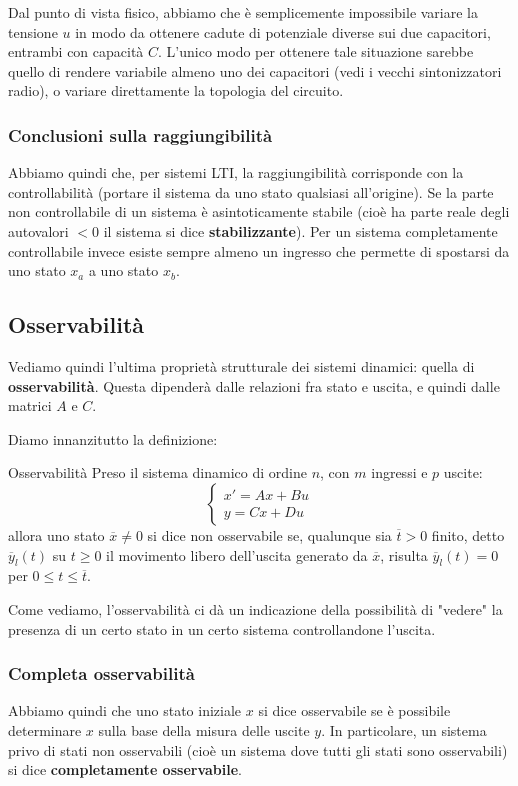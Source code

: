 \documentclass[a4paper,11pt]{article}
\begin{document}
Dal punto di vista fisico, abbiamo che è semplicemente impossibile variare la tensione $u$ in modo da ottenere cadute di potenziale diverse sui due capacitori, entrambi con capacità $C$.
L'unico modo per ottenere tale situazione sarebbe quello di rendere variabile almeno uno dei capacitori (vedi i vecchi sintonizzatori radio), o variare direttamente la topologia del circuito. 

\subsubsection{Conclusioni sulla raggiungibilità}
Abbiamo quindi che, per sistemi LTI, la raggiungibilità corrisponde con la controllabilità (portare il sistema da uno stato qualsiasi all'origine).
Se la parte non controllabile di un sistema è asintoticamente stabile (cioè ha parte reale degli autovalori $< 0$ il sistema si dice \textbf{stabilizzante}).
Per un sistema completamente controllabile invece esiste sempre almeno un ingresso che permette di spostarsi da uno stato $x_a$ a uno stato $x_b$.

\subsection{Osservabilità}
Vediamo quindi l'ultima proprietà strutturale dei sistemi dinamici: quella di \textbf{osservabilità}.
Questa dipenderà dalle relazioni fra stato e uscita, e quindi dalle matrici $A$ e $C$.

Diamo innanzitutto la definizione:
\begin{definition}{Osservabilità}
	Preso il sistema dinamico di ordine $n$, con $m$ ingressi e $p$ uscite:
	\[
		\begin{cases}
			x' = Ax + Bu \\ 
			y = Cx + Du
		\end{cases}
	\]
	allora uno stato $\overline{x} \neq 0$ si dice non osservabile se, qualunque sia $\overline{t} > 0$ finito, detto $\overline{y}_l(t)$ su $t \geq 0$ il movimento libero dell'uscita generato da $\overline{x}$, risulta $\overline{y}_l(t) = 0$ per $0 \leq t \leq \overline{t}$.
\end{definition}

Come vediamo, l'osservabilità ci dà un indicazione della possibilità di "vedere" la presenza di un certo stato in un certo sistema controllandone l'uscita.


\subsubsection{Completa osservabilità}
Abbiamo quindi che uno stato iniziale $x$ si dice osservabile se è possibile determinare $x$ sulla base della misura delle uscite $y$.
In particolare, un sistema privo di stati non osservabili (cioè un sistema dove tutti gli stati sono osservabili) si dice \textbf{completamente osservabile}.
\end{document}
